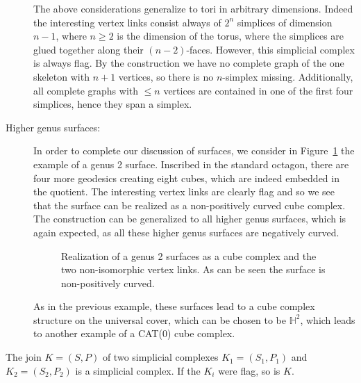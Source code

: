 \begin{bsp}
\begin{description}
    The above considerations generalize to tori in arbitrary dimensions. Indeed the interesting vertex links consist always of \(2^n\) simplices of dimension \(n-1\), where \(n\geq2\) is the dimension of the torus, where the simplices are glued together along their \((n-2)\)-faces. However, this simplicial complex is always flag. By the construction we have no complete graph of the one skeleton with \(n+1\) vertices, so there is no \(n\)-simplex missing. Additionally, all complete graphs with \(\leq n\) vertices are contained in one of the first four simplices, hence they span a simplex.
  \item[Higher genus surfaces:] In order to complete our discussion of surfaces, we consider in Figure~\ref{fig:genus-2} the example of a genus 2 surface. Inscribed in the standard octagon, there are four more geodesics creating eight cubes, which are indeed embedded in the quotient. The interesting vertex links are clearly flag and so we see that the surface can be realized as a non-positively curved cube complex. The construction can be generalized to all higher genus surfaces, which is again expected, as all these higher genus surfaces are negatively curved.
    \begin{figure}[htbp]
      \centering
      
      \caption{Realization of a genus 2 surfaces as a cube complex and the two non-isomorphic vertex links. As can be seen the surface is non-positively curved.}
      \label{fig:genus-2}
    \end{figure}

    As in the previous example, these surfaces lead to a cube complex structure on the universal cover, which can be chosen to be \(\mathbb{H}^2\), which leads to another example of a CAT(0) cube complex.
  \end{description}
\end{bsp}

\begin{lemma}
  \label{lem:flag}
  The join \(K = (S,P)\) of two simplicial complexes \(K_1 = (S_1, P_1)\) and \(K_2 = (S_2, P_2)\) is a simplicial complex. If the \(K_i\) were flag, so is \(K\).
\end{lemma}

